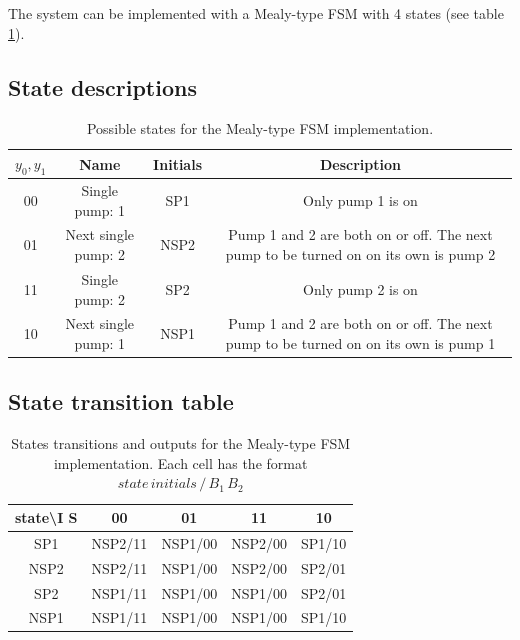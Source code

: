 \documentclass[../../e3_tp3_main.tex]{subfiles}
\begin{document}
The system can be implemented with a Mealy-type FSM with 4 states (see table \ref{tab:ej1_mealy_states}).

\subsection{State descriptions}
\begin{table}[H]	%
	\centering
	\begin{tabular}{|c|c|c|c|}
	\hline	
	$y_0, y_1$ & Name & Initials & Description\\	
	\hline 
	00 & Single pump: 1 &SP1& Only pump 1 is on\\ 
	\hline 
	01 & Next single pump: 2 &NSP2& Pump 1 and 2 are both on or off. The next pump to be turned on on its own is pump 2\\ 
	\hline 
	11 & Single pump: 2 &SP2& Only pump 2 is on\\ 
	\hline 
	10 & Next single pump: 1 &NSP1& Pump 1 and 2 are both on or off. The next pump to be turned on on its own is pump 1 \\ 
	\hline 
	\end{tabular} 
	\caption{Possible states for the Mealy-type FSM implementation.}
	\label{tab:ej1_mealy_states}
\end{table}


\subsection{State transition table}
\begin{table}[H]
	\centering
	\begin{tabular}{|c|c|c|c|c|}
		\hline 
		state\textbackslash I S & 00 & 01 & 11 & 10 \\ 
		\hline 
		SP1 & NSP2/11 & NSP1/00 & NSP2/00 & SP1/10 \\ 
		\hline 
		NSP2 & NSP2/11 & NSP1/00 & NSP2/00 & SP2/01 \\ 
		\hline 
		SP2 & NSP1/11 & NSP1/00 & NSP1/00 & SP2/01 \\ 
		\hline 
		NSP1 & NSP1/11 & NSP1/00 & NSP1/00 & SP1/10 \\ 
		\hline 
	\end{tabular} 
	\caption[States transitions and outputs for the Mealy-type FSM implementation]{States transitions and outputs for the Mealy-type FSM implementation. Each cell has the format $state\, initials \,/\, B_1\, B_2$}
	\label{tab:ej1_mealy_transitions}
\end{table}
\end{document}
